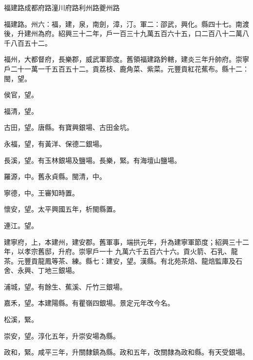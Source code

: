 
\begin{pinyinscope}

 福建路成都府路潼川府路利州路夔州路



 福建路。州六：福，建，泉，南劍，漳，汀。軍二：邵武，興化。縣四十七。南渡後，升建州為府。紹興三十二年，戶一百三十九萬五百六十五，口二百八十二萬八千八百五十二。



 福州，大都督府，長樂郡，威武軍節度。舊領福建路鈐轄，建炎三年升帥府。崇寧戶二十一萬一千五百五十二。貢荔枝、鹿角菜、紫菜。元豐貢紅花蕉布。縣十二：閩，望。



 侯官，望。



 福清，望。



 古田，望。唐縣。有寶興銀場、古田金坑。



 永福，望，有黃洋、保德二銀場。



 長溪，望。有玉林銀場及鹽場。長樂，緊。有海壇山鹽場。



 羅源，中。舊永貞縣。閩清，中。



 寧德，中。王審知時置。



 懷安，望。太平興國五年，析閩縣置。



 連江。望。



 建寧府，上，本建州，建安郡。舊軍事，端拱元年，升為建寧軍節度；紹興三十二年，以孝宗舊邸，升府。崇寧戶一十
 九萬六千五百六十六。貢火箭、石乳、龍茶。元豐貢龍鳳等茶、練。縣七：建安，望。漢縣。有北苑茶焙、龍焙監庫及石舍、永興、丁地三銀場。



 浦城，望。有餘生、蕉溪、斤竹三銀場。



 嘉禾，望。本建陽縣。有瞿嶺四銀場。景定元年改今名。



 松溪，緊。



 崇安，望。淳化五年，升崇安場為縣。



 政和，緊。咸平三年，升關隸鎮為縣。政和五年，改關隸為政和縣。有天受銀場。




\end{pinyinscope}

